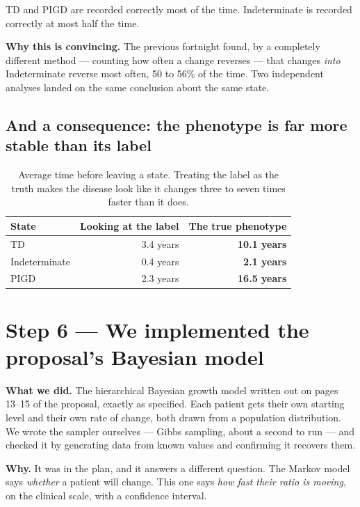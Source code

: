 \documentclass[11pt,a4paper]{article}
\begin{document}
TD and PIGD are recorded correctly most of the time. Indeterminate is recorded
correctly at most half the time.

\textbf{Why this is convincing.} The previous fortnight found, by a completely
different method --- counting how often a change reverses --- that changes
\emph{into} Indeterminate reverse most often, 50 to 56\% of the time. Two
independent analyses landed on the same conclusion about the same state.

\subsection*{And a consequence: the phenotype is far more stable than its label}

\begin{table}[H]
\centering
\begin{tabular}{@{}lrr@{}}
\toprule
\textbf{State} & \textbf{Looking at the label} & \textbf{The true phenotype} \\
\midrule
TD            & 3.4 years & \textbf{10.1 years} \\
Indeterminate & 0.4 years & \phantom{0}\textbf{2.1 years} \\
PIGD          & 2.3 years & \textbf{16.5 years} \\
\bottomrule
\end{tabular}
\caption{Average time before leaving a state. Treating the label as the truth
makes the disease look like it changes three to seven times faster than it
does.}
\end{table}

\section{Step 6 --- We implemented the proposal's Bayesian model}

\textbf{What we did.} The hierarchical Bayesian growth model written out on
pages 13--15 of the proposal, exactly as specified. Each patient gets their own
starting level and their own rate of change, both drawn from a population
distribution. We wrote the sampler ourselves --- Gibbs sampling, about a second
to run --- and checked it by generating data from known values and confirming it
recovers them.

\textbf{Why.} It was in the plan, and it answers a different question. The
Markov model says \emph{whether} a patient will change. This one says \emph{how
fast their ratio is moving}, on the clinical scale, with a confidence interval.
\end{document}
